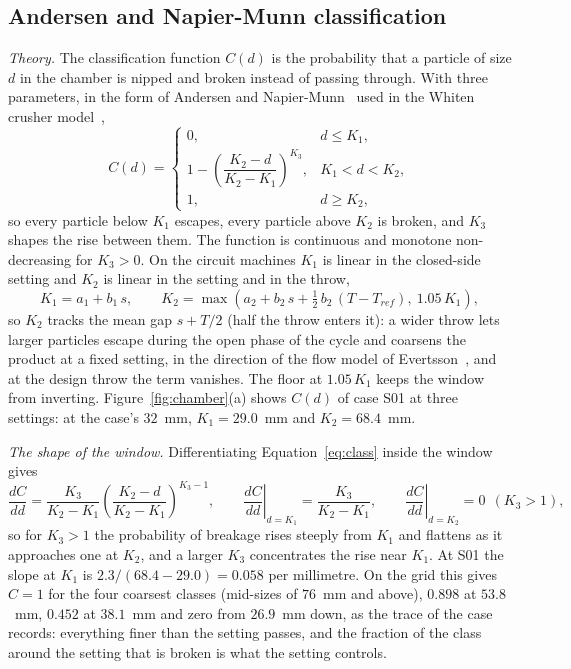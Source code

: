 \subsection{Andersen and Napier-Munn classification}\label{sec:m-class}

\emph{Theory.} The classification function $C(d)$ is the probability that a particle of size $d$ in the chamber is nipped and broken
instead of passing through. With three parameters, in the form of Andersen and Napier-Munn~\cite{andersen1988} used in the Whiten
crusher model~\cite{whiten1972,napier1996},
\begin{equation}
C(d) = \begin{cases} 0, & d \le K_1,\\[2pt] 1 - \left(\dfrac{K_2 - d}{K_2 - K_1}\right)^{K_3}, & K_1 < d < K_2,\\[8pt] 1, & d\ge K_2,\end{cases}
\label{eq:class}
\end{equation}
so every particle below $K_1$ escapes, every particle above $K_2$ is broken, and $K_3$ shapes the rise between them. The function is
continuous and monotone non-decreasing for $K_3>0$. On the circuit machines $K_1$ is linear in the closed-side setting and $K_2$ is
linear in the setting and in the throw,
\begin{equation}
K_1 = a_1 + b_1\,s,\qquad K_2 = \max\!\left(a_2 + b_2\,s + \tfrac12\,b_2\,(T - T_{ref}),\ 1.05\,K_1\right),
\label{eq:k1k2}
\end{equation}
so $K_2$ tracks the mean gap $s+T/2$ (half the throw enters it): a wider throw lets larger particles escape during the open phase of the cycle and
coarsens the product at a fixed setting, in the direction of the flow model of Evertsson~\cite{evertsson1999}, and at the design
throw the term vanishes. The floor at $1.05\,K_1$ keeps the window from inverting. Figure~\ref{fig:chamber}(a) shows $C(d)$ of case
S01 at three settings: at the case's $32$~mm, $K_1=29.0$~mm and $K_2=68.4$~mm.

\emph{The shape of the window.} Differentiating Equation~\eqref{eq:class} inside the window gives
\begin{equation}
\frac{dC}{dd} = \frac{K_3}{K_2-K_1}\left(\frac{K_2-d}{K_2-K_1}\right)^{K_3-1},\qquad
\left.\frac{dC}{dd}\right|_{d=K_1} = \frac{K_3}{K_2-K_1},\qquad \left.\frac{dC}{dd}\right|_{d=K_2} = 0 \ \ (K_3>1),
\label{eq:dclass}
\end{equation}
so for $K_3>1$ the probability of breakage rises steeply from $K_1$ and flattens as it approaches one at $K_2$, and a larger $K_3$
concentrates the rise near $K_1$. At S01 the slope at $K_1$ is $2.3/(68.4-29.0)=0.058$ per millimetre. On the grid this gives $C=1$ for the
four coarsest classes (mid-sizes of $76$~mm and above), $0.898$ at $53.8$~mm, $0.452$ at $38.1$~mm and zero from $26.9$~mm down, as the trace
of the case records: everything finer than the setting passes, and the fraction of the class around the setting that is broken is what the
setting controls.

